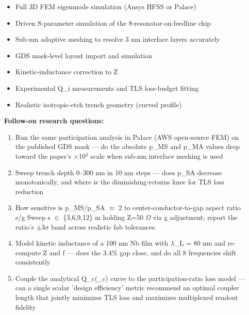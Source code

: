 \begin{itemize}[leftmargin=1.4em,itemsep=0.2em,topsep=0.2em]
\item Full 3D FEM eigenmode simulation (Ansys HFSS or Palace)
\item Driven S-parameter simulation of the 8-resonator-on-feedline chip
\item Sub-nm adaptive meshing to resolve 3 nm interface layers accurately
\item GDS mask-level layout import and simulation
\item Kinetic-inductance correction to Z
\item Experimental Q\_i measurements and TLS loss-budget fitting
\item Realistic isotropic-etch trench geometry (curved profile)
\end{itemize}\noindent\textbf{Follow-on research questions:}
\begin{enumerate}[leftmargin=1.6em,itemsep=0.2em,topsep=0.2em,label=Q\arabic*.]
\item Run the same participation analysis in Palace (AWS open-source FEM) on the published GDS mask --- do the absolute p\_MS and p\_MA values drop toward the paper's $\times$10$^3$ scale when sub-nm interface meshing is used
\item Sweep trench depth 0--300 nm in 10 nm steps --- does p\_SA decrease monotonically, and where is the diminishing-returns knee for TLS loss reduction
\item How sensitive is p\_MS/p\_SA $\approx$ 2 to center-conductor-to-gap aspect ratio s/g Sweep s $\in$ \{3,6,9,12\} m holding Z=50 $\Omega$ via g adjustment; report the ratio's $\pm$3$\sigma$ band across realistic fab tolerances.
\item Model kinetic inductance of a 100 nm Nb film with $\lambda$\_L = 80 nm and re-compute Z and f --- does the 3.4\% gap close, and do all 8 frequencies shift consistently
\item Couple the analytical Q\_c(\_c) curve to the participation-ratio loss model --- can a single scalar 'design efficiency' metric recommend an optimal coupler length that jointly minimizes TLS loss and maximizes multiplexed readout fidelity
\end{enumerate}

